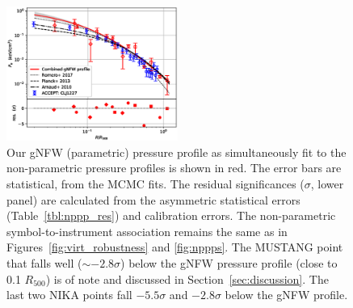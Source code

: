 \documentclass[onecolumn,traditabstract]{aa}
\begin{document}
\begin{figure}[!h]
  \centering
  \includegraphics[width=0.5\textwidth]{NIKA_ml_deproj_figs/Real_Joint_gNFW_Power_Real_11011111_2500S_500B_100W_gNFW_pressure_w_NP_pts_v2_p16cosmo_v2.eps}
  \caption{Our gNFW (parametric) pressure profile as simultaneously fit to the non-parametric pressure profiles is shown in red.
    The error bars are statistical, from the MCMC fits. The residual significances ($\sigma$, lower panel) are calculated from the
    asymmetric statistical errors (Table~\ref{tbl:nppp_res}) and calibration errors.
    The non-parametric symbol-to-instrument association remains the same as in Figures~\ref{fig:virt_robustness} and \ref{fig:nppps}.
    The MUSTANG point that falls well ($\sim-2.8\sigma$) below the gNFW pressure profile (close to 0.1 $R_{500}$) is of
    note and discussed in Section~\ref{sec:discussion}. The last two NIKA points fall $-5.5\sigma$ and $-2.8\sigma$ below the gNFW
    profile.}
  \label{fig:joint_pressure}
\end{figure}

\end{document}

